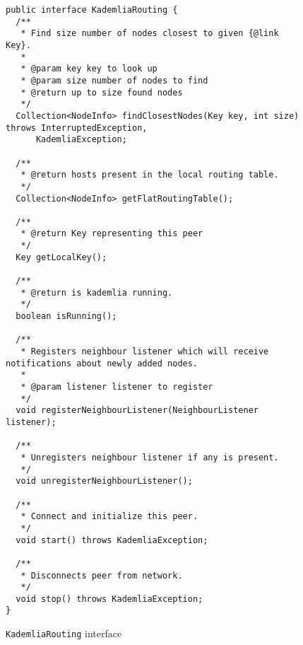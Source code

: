 \begin{figure}[tbp]
\begin{lstlisting}
public interface KademliaRouting {
  /**
   * Find size number of nodes closest to given {@link Key}.
   *
   * @param key key to look up
   * @param size number of nodes to find
   * @return up to size found nodes
   */
  Collection<NodeInfo> findClosestNodes(Key key, int size) throws InterruptedException,
      KademliaException;

  /**
   * @return hosts present in the local routing table.
   */
  Collection<NodeInfo> getFlatRoutingTable();

  /**
   * @return Key representing this peer
   */
  Key getLocalKey();

  /**
   * @return is kademlia running.
   */
  boolean isRunning();

  /**
   * Registers neighbour listener which will receive notifications about newly added nodes.
   *
   * @param listener listener to register
   */
  void registerNeighbourListener(NeighbourListener listener);

  /**
   * Unregisters neighbour listener if any is present.
   */
  void unregisterNeighbourListener();

  /**
   * Connect and initialize this peer.
   */
  void start() throws KademliaException;

  /**
   * Disconnects peer from network.
   */
  void stop() throws KademliaException;
}
\end{lstlisting}
\caption{\texttt{KademliaRouting} interface}
\label{fig:routing_interface}
\end{figure}

